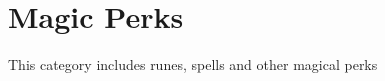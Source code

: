 \chapter{Magic Perks}\label{ch:magicPerks}
This category includes runes, spells and other magical perks

	

	
	
	